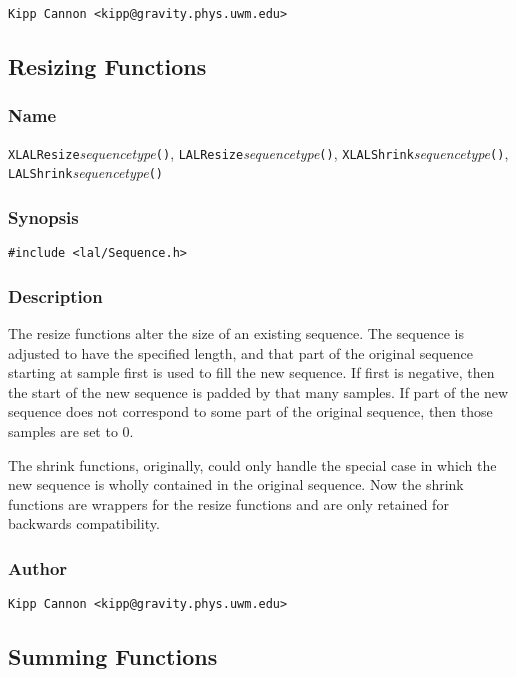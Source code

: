 \verb|Kipp Cannon <kipp@gravity.phys.uwm.edu>|


\subsection{Resizing Functions}

\subsubsection{Name}

\texttt{XLALResize}\textit{sequencetype}\texttt{()},
\texttt{LALResize}\textit{sequencetype}\texttt{()},
\texttt{XLALShrink}\textit{sequencetype}\texttt{()},
\texttt{LALShrink}\textit{sequencetype}\texttt{()}

\subsubsection{Synopsis}

\begin{verbatim}
#include <lal/Sequence.h>
\end{verbatim}


\subsubsection{Description}

The resize functions alter the size of an existing sequence.  The sequence
is adjusted to have the specified length, and that part of the original
sequence starting at sample first is used to fill the new sequence.  If
first is negative, then the start of the new sequence is padded by that
many samples.  If part of the new sequence does not correspond to some part
of the original sequence, then those samples are set to 0.

The shrink functions, originally, could only handle the special case in
which the new sequence is wholly contained in the original sequence.  Now
the shrink functions are wrappers for the resize functions and are only
retained for backwards compatibility.

\subsubsection{Author}

\verb|Kipp Cannon <kipp@gravity.phys.uwm.edu>|


\subsection{Summing Functions}

